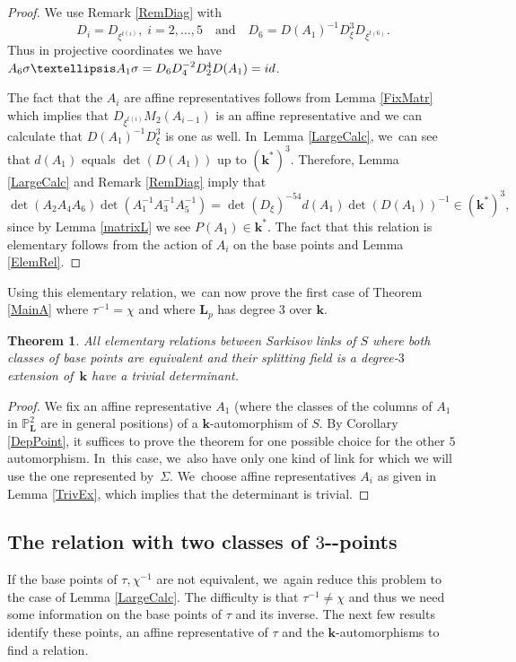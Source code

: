 \documentclass[10pt,a4paper]{amsart}
\providecommand{\nobreakdash}{\nobreak\hbox{-}}
\newcommand{\id}{\textup{id}}
\newcommand{\quand}{\quad\text{and}\quad}
\newtheorem{theorem}{Theorem}[section]
\theoremstyle{definition}
\newcommand{\kk}{{\boldsymbol{k}}}
\newcommand{\LL}{{\boldsymbol{L}}}
\begin{document}
\begin{proof}
We use Remark \ref{RemDiag} with
\[
D_i = D_{\xi^{t(i)}},\; i = 2, \dots , 5\quand D_6 = D(A_1)^{-1}D_{\xi}^3D_{\xi^{t(6)}}.
\]
Thus in projective coordinates we have $A_6 \sigma \dots A_1 \sigma = D_6 D_4^{-2}D_2^4 D(A_1) = \id$.

The fact that the $A_i$ are affine representatives follows from Lemma \ref{FixMatr} which implies that $D_{\xi^{t(i)}}M_2(A_{i-1})$ is an affine representative and we can calculate that $D(A_1)^{-1}D_{\xi}^3$ is one as well. In~Lemma \ref{LargeCalc}, we~can see that $d(A_1)$ equals $\det(D(A_1))$ up to $(\kk^*)^3$. Therefore, Lemma \ref{LargeCalc} and Remark \ref{RemDiag} imply that
\[
\det(A_2A_4A_6)\det(A_1^{-1}A_3^{-1}A_5^{-1}) = \det(D_{\xi})^{-54} d(A_1) \det(D(A_1))^{-1} \in (\kk^*)^3,
\]
since by Lemma \ref{matrixL} we see $P(A_1) \in \kk^*$. The fact that this relation is elementary follows from the action of $A_i$ on the base points and Lemma \ref{ElemRel}.
\end{proof}
Using this elementary relation, we~can now prove the first case of Theorem \ref{MainA} where $\tau^{-1} = \chi$ and where $\LL_p$ has degree $3$ over $\kk$.

\begin{theorem} \label{TrivialCase}
All elementary relations between Sarkisov links of $S$ where both classes of base points are equivalent and their splitting field is a degree-$3$ extension of~$\kk$ have a trivial determinant.
\end{theorem}

\begin{proof}
We fix an affine representative $A_1$ (where the classes of the columns of $A_1$ in $\mathbb{P}^2_{\LL}$ are in general positions) of a $\kk$-automorphism of $S$. By Corollary \ref{DepPoint}, it suffices to prove the theorem for one possible choice for the other $5$ automorphism. In~this case, we~also have only one kind of link for which we will use the one represented by~$\Sigma$. We~choose affine representatives $A_i$ as given in Lemma \ref{TrivEx}, which implies that the determinant is trivial.
\end{proof}

\subsection{The relation with two classes of $3$\nobreakdash-points}
If the base points of $\tau,\chi^{-1}$ are not equivalent, we~again reduce this problem to the case of Lemma \ref{LargeCalc}. The difficulty is that $\tau^{-1} \neq \chi$ and thus we need some information on the base points of $\tau$ and its inverse. The next few results identify these points, an affine representative of $\tau$ and the $\kk$-automorphisms to find a relation.
\end{document}
